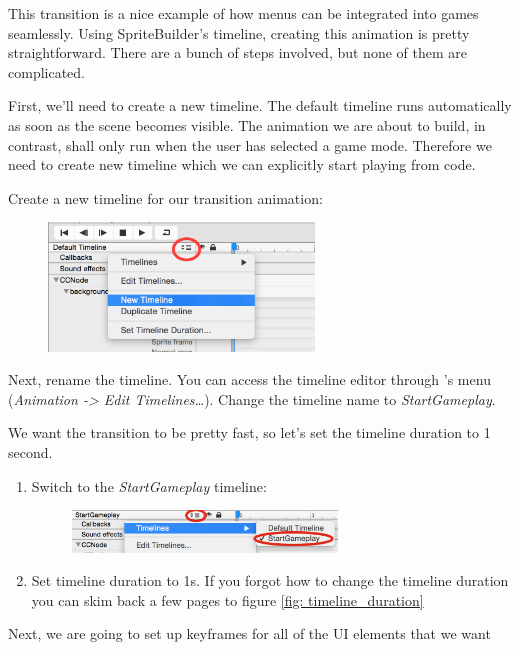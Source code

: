 This transition is a nice example of how menus can be integrated into games
seamlessly. Using SpriteBuilder's timeline, creating this animation is pretty
straightforward. There are a bunch of steps involved, but none of them are
complicated. 

First, we'll need to create a new timeline. The default timeline runs
automatically as soon as the scene becomes visible. The animation we are about
to build, in contrast, shall only run when the user has selected a game mode.
Therefore we need to create new timeline which we can explicitly start playing
from code.

\begin{leftbar}
Create a new timeline for our transition animation:
\begin{figure}[H]
		\centering
		\includegraphics[width=200pt]{images/Chapter7/new_timeline.png}
\end{figure}
Next, rename the timeline. You can access the timeline editor through \SB{}'s
menu (\textit{Animation -> Edit Timelines\ldots}). Change the timeline name to
\textit{StartGameplay}.
\end{leftbar}
We want the transition to be pretty fast, so let's set the timeline duration to
1 second.
\begin{leftbar}
\begin{enumerate}
  \item Switch to the \textit{StartGameplay} timeline:
  \begin{figure}[H]
    \centering
    \includegraphics[width=200pt]{images/Chapter7/switch_timeline.png}
\end{figure}
  \item Set timeline duration to 1s. If you forgot how to change the timeline duration
you can skim back a few pages to figure \ref{fig: timeline_duration}
\end{enumerate}
\end{leftbar}
Next, we are going to set up keyframes for all of the UI elements that we want
